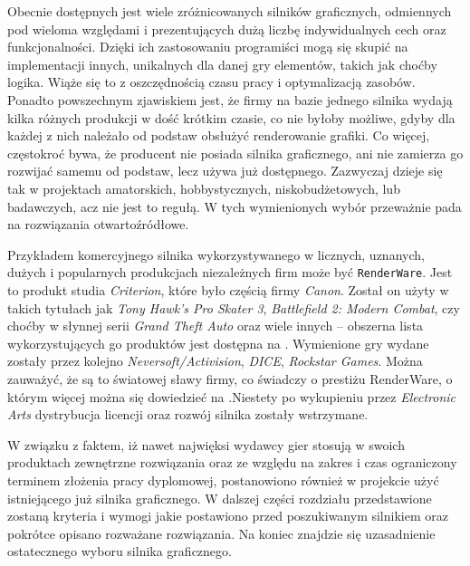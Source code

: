 \documentclass[11pt]{mwrep}
\begin{document}
    Obecnie dostępnych jest wiele zróżnicowanych silników graficznych, odmiennych pod wieloma względami i prezentujących dużą liczbę indywidualnych cech oraz funkcjonalności. Dzięki ich zastosowaniu programiści mogą się skupić na implementacji innych, unikalnych dla danej gry elementów, takich jak choćby logika. Wiąże się to z oszczędnością czasu pracy i optymalizacją zasobów. Ponadto powszechnym zjawiskiem jest, że firmy na bazie jednego silnika wydają kilka różnych produkcji w dość krótkim czasie, co nie byłoby możliwe, gdyby dla każdej z nich należało od podstaw obsłużyć renderowanie grafiki. Co więcej, częstokroć bywa, że producent nie posiada silnika graficznego, ani nie zamierza go rozwijać samemu od podstaw, lecz używa już dostępnego. Zazwyczaj dzieje się tak w projektach amatorskich, hobbystycznych, niskobudżetowych, lub badawczych, acz nie jest to regułą. W tych wymienionych wybór przeważnie pada na rozwiązania otwartoźródłowe.

    Przykładem komercyjnego silnika wykorzystywanego w licznych, uznanych, dużych i popularnych produkcjach niezależnych firm może być \texttt{RenderWare}. Jest to produkt studia \textit{Criterion}, które było częścią firmy \textit{Canon}. Został on użyty w takich tytułach jak \textit{Tony Hawk's Pro Skater 3}, \textit{Battlefield 2: Modern Combat}, czy choćby w słynnej serii \textit{Grand Theft Auto} oraz wiele innych -- obszerna lista wykorzystujących go produktów jest dostępna na \cite{renderware:list}. Wymienione gry wydane zostały przez kolejno  \textit{Neversoft/Activision}, \textit{DICE}, \textit{Rockstar Games}. Można zauważyć, że są to światowej sławy firmy, co świadczy o prestiżu RenderWare, o którym więcej można się dowiedzieć na \cite{renderware}.Niestety po wykupieniu przez \textit{Electronic Arts} dystrybucja licencji oraz rozwój silnika zostały wstrzymane.


    W związku z faktem, iż nawet najwięksi wydawcy gier stosują w swoich produktach zewnętrzne rozwiązania oraz ze względu na zakres i czas ograniczony terminem złożenia pracy dyplomowej, postanowiono również w projekcie użyć istniejącego już silnika graficznego. W dalszej części rozdziału przedstawione zostaną kryteria i wymogi jakie postawiono przed poszukiwanym silnikiem oraz pokrótce opisano rozważane rozwiązania. Na koniec znajdzie się uzasadnienie ostatecznego wyboru silnika graficznego.
\end{document}
